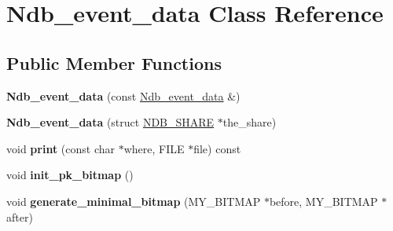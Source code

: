 \hypertarget{classNdb__event__data}{}\section{Ndb\+\_\+event\+\_\+data Class Reference}
\label{classNdb__event__data}
\subsection*{Public Member Functions}
\begin{DoxyCompactItemize}
\item 
\mbox{\label{classNdb__event__data_a3cf4b0d55476e20d8fd9ee8450f3f47d}} 
{\bfseries Ndb\+\_\+event\+\_\+data} (const \mbox{\hyperlink{classNdb__event__data}{Ndb\+\_\+event\+\_\+data}} \&)
\item 
\mbox{\label{classNdb__event__data_ac06f6ba6e61c8df9d009273467647ef1}} 
{\bfseries Ndb\+\_\+event\+\_\+data} (struct \mbox{\hyperlink{structNDB__SHARE}{N\+D\+B\+\_\+\+S\+H\+A\+RE}} $\ast$the\+\_\+share)
\item 
\mbox{\label{classNdb__event__data_a557dc7faf518b2f71131f99bbbca3e3e}} 
void {\bfseries print} (const char $\ast$where, F\+I\+LE $\ast$file) const
\item 
\mbox{\label{classNdb__event__data_af7af07da8fc6a33327ecb81c3e3ccaad}} 
void {\bfseries init\+\_\+pk\+\_\+bitmap} ()
\item 
\mbox{\label{classNdb__event__data_a392ae30c7cfba501b99eae60cdb2df49}} 
void {\bfseries generate\+\_\+minimal\+\_\+bitmap} (M\+Y\+\_\+\+B\+I\+T\+M\+AP $\ast$before, M\+Y\+\_\+\+B\+I\+T\+M\+AP $\ast$after)
\end{DoxyCompactItemize}
